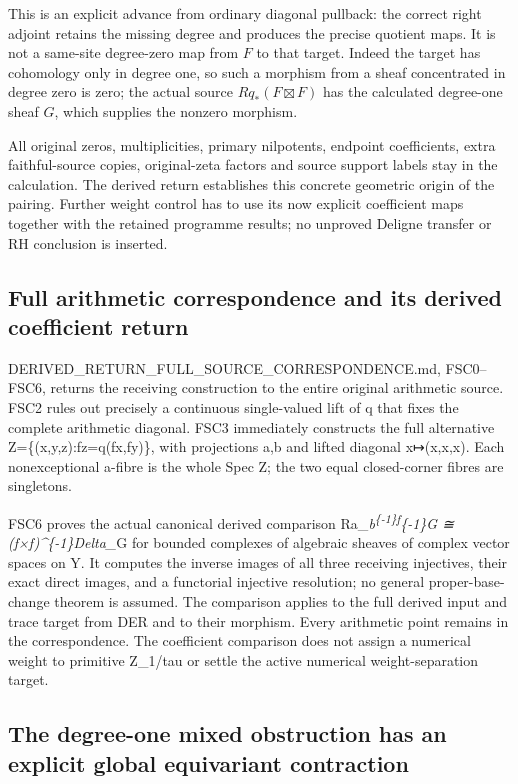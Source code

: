 This is an explicit advance from ordinary diagonal pullback: the correct
right adjoint retains the missing degree and produces the precise
quotient maps. It is not a same-site degree-zero map from \(F\) to that
target. Indeed the target has cohomology only in degree one, so such a
morphism from a sheaf concentrated in degree zero is zero; the actual
source \(Rq_*(F\boxtimes F)\) has the calculated degree-one sheaf \(G\),
which supplies the nonzero morphism.

All original zeros, multiplicities, primary nilpotents, endpoint
coefficients, extra faithful-source copies, original-zeta factors and
source support labels stay in the calculation. The derived return
establishes this concrete geometric origin of the pairing. Further
weight control has to use its now explicit coefficient maps together
with the retained programme results; no unproved Deligne transfer or RH
conclusion is inserted.

\subsection{Full arithmetic correspondence and its derived coefficient
return}\label{full-arithmetic-correspondence-and-its-derived-coefficient-return-2}

DERIVED\_RETURN\_FULL\_SOURCE\_CORRESPONDENCE.md, FSC0--FSC6, returns
the receiving construction to the entire original arithmetic source.
FSC2 rules out precisely a continuous single-valued lift of q that fixes
the complete arithmetic diagonal. FSC3 immediately constructs the full
alternative Z=\{(x,y,z):fz=q(fx,fy)\}, with projections a,b and lifted
diagonal x↦(x,x,x). Each nonexceptional a-fibre is the whole Spec Z; the
two equal closed-corner fibres are singletons.

FSC6 proves the actual canonical derived comparison
Ra\_\emph{b\textsuperscript{\{-1\}f}\{-1\}G ≅ (f×f)\^{}\{-1\}Delta\_}G
for bounded complexes of algebraic sheaves of complex vector spaces on
Y. It computes the inverse images of all three receiving injectives,
their exact direct images, and a functorial injective resolution; no
general proper-base-change theorem is assumed. The comparison applies to
the full derived input and trace target from DER and to their morphism.
Every arithmetic point remains in the correspondence. The coefficient
comparison does not assign a numerical weight to primitive Z\_1/tau or
settle the active numerical weight-separation target.

\subsection{The degree-one mixed obstruction has an explicit global
equivariant
contraction}\label{the-degree-one-mixed-obstruction-has-an-explicit-global-equivariant-contraction-2}

